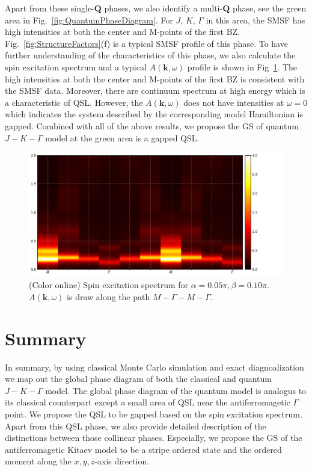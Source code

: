 \documentclass[aps,prb,reprint,amsfonts,amsmath,amssymb,showpacs,groupedaddress,superscriptaddress]{revtex4-1}
\begin{document}
Apart from these single-$\mathbf{Q}$ phases, we also identify a multi-$\mathbf{Q}$ phase, see the green area in Fig.~\ref{fig:QuantumPhaseDiagram}. For $J$, $K$, $\Gamma$ in this area, the SMSF has high intensities at both the center and M-points of the first BZ. Fig.~\ref{fig:StructureFactors}(f) is a typical SMSF profile of this phase. To have further understanding of the characteristics of this phase, we also calculate the spin excitation spectrum and a typical $A(\mathbf{k}, \omega)$ profile is shown in Fig~\ref{fig:Spectrum}. The high intensities at both the center and M-points of the first BZ is consistent with the SMSF data. Moreover, there are continuum spectrum at high energy which is a characteristic of QSL. However, the $A(\mathbf{k}, \omega)$ does not have intensities at $\omega = 0$ which indicates the system described by the corresponding model Hamiltonian is gapped. Combined with all of the above results, we propose the GS of quantum $J-K-\Gamma$ model at the green area is a gapped QSL.
\begin{figure}
    \centering
    \includegraphics[width=\columnwidth]{fig/Spectrum.pdf}
    \caption{\label{fig:Spectrum}(Color online) Spin excitation spectrum for $\alpha=0.05\pi,\beta=0.10\pi$. $A(\bm{k}, \omega)$ is draw along the path $M-\Gamma-M-\Gamma$.}
\end{figure}


\section{\label{sec:Summary}Summary}
In summary, by using classical Monte Carlo simulation and exact diagnoalization we map out the global phase diagram of both the classical and quantum $J-K-\Gamma$ model. The global phase diagram of the quantum model is analogus to its classical counterpart except a small area of QSL near the antiferromagetic $\Gamma$ point. We propose the QSL to be gapped based on the spin excitation spectrum. Apart from this QSL phase, we also provide detailed description of the distinctions between those collinear phases. Especially, we propose the GS of the antiferromagetic Kitaev model to be a stripe ordered state and the ordered moment along the $x, y, z$-axis direction.
\end{document}
